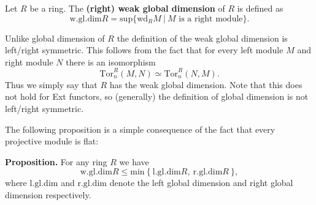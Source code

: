 \documentclass[12pt]{article}
\begin{document}
Let $R$ be a ring. The \textbf{(right) weak global dimension} of $R$ is defined as
$$\mathrm{w.gl.dim}R=\mathrm{sup}\{\mathrm{wd}_RM\ |\ M\mbox{ is a right module}\}.$$

Unlike global dimension of $R$ the definition of the weak global dimension is left/right symmetric. This follows from the fact that for every left module $M$ and right module $N$ there is an isomorphism
$$\mathrm{Tor}_n^R(M,N)\simeq\mathrm{Tor}_n^R(N,M).$$
Thus we simply say that $R$ has the weak global dimension. Note that this does not hold for Ext functors, so (generally) the definition of global dimension is not left/right symmetric.

The following proposition is a simple consequence of the fact that every projective module is flat:

\textbf{Proposition.} For any ring $R$ we have
$$\mathrm{w.gl.dim}R\leqslant\mathrm{min}\ \{\ \mathrm{l.gl.dim}R,\ \mathrm{r.gl.dim}R\ \},$$
where $\mathrm{l.gl.dim}$ and $\mathrm{r.gl.dim}$ denote the left global dimension and right global dimension respectively.
\end{document}
